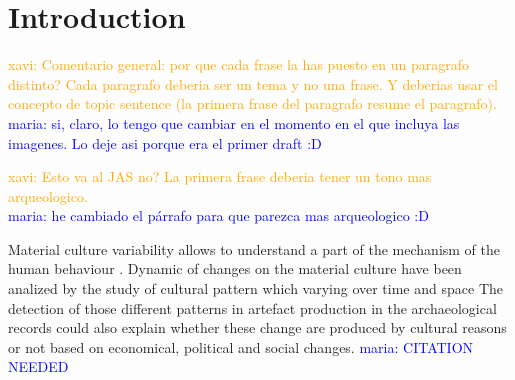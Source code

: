 \documentclass[review]{elsarticle}
\newcommand{\memo}[2]{\textcolor{#1}{#2}}
\newcommand{\xavi}[1]{\memo{orange}{xavi: #1\\}}
\newcommand{\maria}[1]{\memo{blue}{maria: #1\\}}
\begin{document}



\section{Introduction}

\xavi{Comentario general: por que cada frase la has puesto en un paragrafo distinto? Cada paragrafo deberia ser un tema y no una frase. Y deberias usar el concepto de topic sentence (la primera frase del paragrafo resume el paragrafo).}
\maria{si, claro, lo tengo que cambiar en el momento en el que incluya las imagenes. Lo deje asi porque era el primer draft :D}


\xavi{Esto va al JAS no? La primera frase deberia tener un tono mas arqueologico.}
\maria{he cambiado el párrafo para que parezca mas arqueologico :D}

  

Material culture variability allows to understand a part of the mechanism of the human behaviour \citep{basalla1988evolution, schillinger_copying_2016}. Dynamic of changes on the material culture have been analized by the study of cultural pattern which varying over time and space \citep{eerkens_jelmer_cultural_2007, lycett_cultural_2015} The detection of those  different patterns in artefact production in the archaeological records could also explain whether these change are produced by cultural reasons or not based on economical, political and social changes. \maria{CITATION NEEDED}
\end{document}
